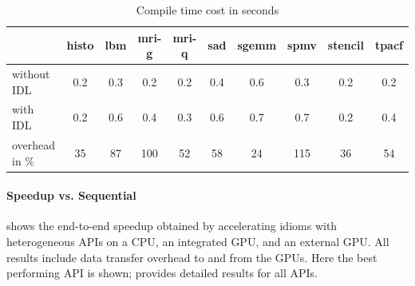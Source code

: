 \begin{table}[t]
  \begin{tabular}{lccccccccc}
  \toprule
  & \hspace{0.530mm}histo\hspace{0.53mm}
  & \hspace{0.530mm}lbm\hspace{0.530mm}
  & \hspace{0.530mm}mri-g\hspace{0.530mm}
  & \hspace{0.530mm}mri-q\hspace{0.530mm}
  & \hspace{0.530mm}sad\hspace{0.530mm}
  & \hspace{0.530mm}sgemm\hspace{0.530mm}
  & \hspace{0.530mm}spmv\hspace{0.530mm}
  & \hspace{0.530mm}stencil\hspace{0.530mm}
  & \hspace{0.530mm}tpacf\hspace{0.530mm} \\
  \midrule
without IDL    & 0.2 & 0.3 & 0.2 & 0.2 & 0.4 & 0.6 & 0.3 & 0.2 & 0.2 \\[0.25em]
with IDL       & 0.2 & 0.6 & 0.4 & 0.3 & 0.6 & 0.7 & 0.7 & 0.2 & 0.4 \\[0.75em]
overhead in \% &  35 &  87 & 100 &  52 &  58 &  24 & 115 &  36 &  54 \\
  \bottomrule
\end{tabular}

  \vspace{.1cm}
\caption{Compile time cost in seconds}
\label{tab:compiletimecost}
\end{table}
\addtolength{\tabcolsep}{+.3em}

\paragraph*{Speedup vs. Sequential}
 shows the end-to-end speedup obtained by accelerating idioms with heterogeneous APIs on a CPU, an integrated GPU, and an external GPU.
All results include data transfer overhead to and from the GPUs.
Here the best performing API is shown;
 provides detailed results for all APIs. 

